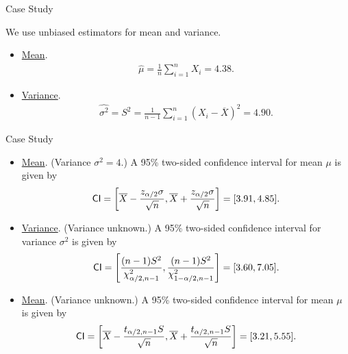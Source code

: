 \begin{frame}{Case Study}

\justifying
{} We use unbiased estimators for mean and variance.
\begin{itemize}
	\item \underline{Mean}.
	\begin{align*}
	\widehat{\mu} = \frac{1}{n}\sum_{i=1}^n X_i = 4.38.
	\end{align*}
	\item \underline{Variance}.
	\begin{align*}
	\widehat{\sigma^2} = S^2 = \frac{1}{n-1} \sum_{i=1}^n (X_i - \overline{X})^2 = 4.90.
	\end{align*}
\end{itemize}

\end{frame}


\begin{frame}{Case Study}

\justifying
{}
\begin{itemize}
	\justifying
	\item \underline{Mean}. (Variance $\sigma^2 = 4$.) A 95\% two-sided confidence interval for mean $\mu$ is given by
	\begin{align*}
	\mathsf{CI} = \left[\overline{X} - \frac{z_{\alpha/2}\sigma}{\sqrt{n}}, \overline{X} + \frac{z_{\alpha/2}\sigma}{\sqrt{n}} \right] = [3.91, 4.85].
	\end{align*}
	\item \underline{Variance}. (Variance unknown.) A 95\% two-sided confidence interval for variance $\sigma^2$ is given by
	\begin{align*}
	\mathsf{CI} = \left[\frac{(n-1)S^2}{\chi_{\alpha/2, n-1}^2}, \frac{(n-1)S^2}{\chi_{1-\alpha/2, n-1}^2} \right] = [3.60, 7.05].
	\end{align*}
	\item \underline{Mean}. (Variance unknown.) A 95\% two-sided confidence interval for mean $\mu$ is given by
	\begin{align*}
	\mathsf{CI} = \left[\overline{X} - \frac{t_{\alpha/2, n-1} S}{\sqrt{n}}, \overline{X} + \frac{t_{\alpha/2, n-1} S}{\sqrt{n}} \right] = [3.21, 5.55].
	\end{align*}
\end{itemize}

\end{frame}


